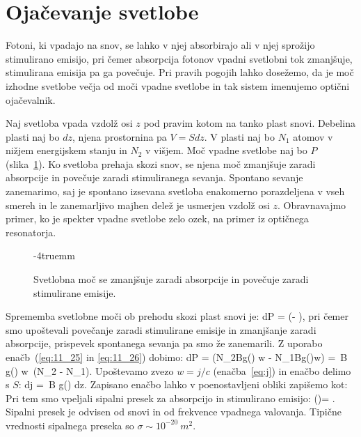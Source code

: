 \section{Ojačevanje svetlobe}
Fotoni, ki vpadajo na snov, se lahko v njej absorbirajo ali v njej sprožijo
stimulirano emisijo, pri čemer absorpcija fotonov vpadni svetlobni tok 
zmanjšuje, stimulirana emisija pa ga povečuje. Pri pravih pogojih lahko
dosežemo, da je moč izhodne svetlobe večja od moči vpadne svetlobe in tak
sistem imenujemo optični ojačevalnik.

Naj svetloba vpada vzdolž osi $z$ pod pravim kotom na tanko plast snovi. 
Debelina plasti naj bo $dz$, njena prostornina pa $V = S dz$. V plasti naj 
bo $N_1$ atomov v nižjem energijskem stanju in $N_2$ v višjem. 
Moč vpadne svetlobe naj bo $P$ (slika~\ref{fig:11_absorpcija}). Ko 
svetloba prehaja skozi snov, se njena moč zmanjšuje zaradi absorpcije 
in povečuje zaradi stimuliranega sevanja. Spontano sevanje 
zanemarimo, saj je spontano izsevana svetloba enakomerno 
porazdeljena v vseh smereh in le zanemarljivo majhen delež je usmerjen 
vzdolž osi $z$. Obravnavajmo primer, ko je spekter vpadne svetlobe
zelo ozek, na primer iz optičnega resonatorja.
\begin{figure}[h!]
\centering
\def\svgwidth{70truemm} 

\caption{Svetlobna moč se zmanjšuje zaradi absorpcije in povečuje
zaradi stimulirane emisije.}
\vglue-4truemm
\label{fig:11_absorpcija}
\end{figure}

Sprememba svetlobne moči ob prehodu skozi plast snovi je:
\beq
dP = \hslash \omega \left(- 
\right)\!\!,
\label{eq:11_27}
\eeq
pri čemer smo upoštevali povečanje zaradi stimulirane emisije in zmanjšanje
zaradi absorpcije, prispevek spontanega sevanja pa smo že zanemarili.
Z uporabo enačb~(\ref{eq:11_25} in \ref{eq:11_26}) dobimo:
\beq
dP = 
\hslash \omega \left(N_2Bg(\omega) w - N_1Bg(\omega)w\right) = 
\hslash \omega\,B g(\omega) w\, (N_2 - N_1).
\label{eq:11_28}
\eeq
Upoštevamo zvezo $w = j/c$ (enačba~\ref{eq:j}) in enačbo delimo s $S$:
\beq
dj = \hslash \omega\,B g(\omega) dz.
\label{eq:11_29}
\eeq
Zapisano enačbo lahko v poenostavljeni obliki zapišemo kot:
Pri tem smo vpeljali sipalni presek za absorpcijo in stimulirano emisijo:
\beq
\sigma (\omega)= .
\label{eq:11_30}
\eeq
Sipalni presek je odvisen od snovi in od frekvence vpadnega valovanja. 
Tipične vrednosti sipalnega preseka so $\sigma \sim 10^{-20}~\si{m^2}$.

